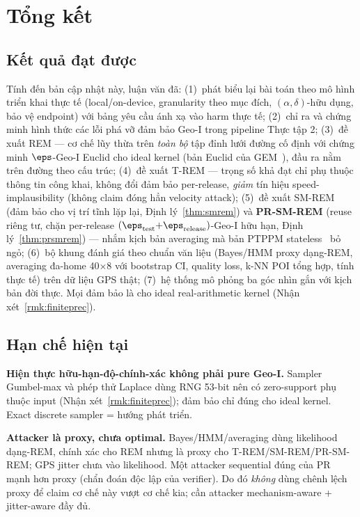 \chapter{Tổng kết}
\label{ch:tongket}

\section{Kết quả đạt được}

Tính đến bản cập nhật này, luận văn đã: (1)~phát biểu lại bài toán theo mô hình
triển khai thực tế (local/on-device, granularity theo mục đích, $(\alpha,\delta)$-hữu
dụng, bảo vệ endpoint) với bảng yêu cầu ánh xạ vào harm thực tế; (2)~chỉ ra và
chứng minh hình thức các lỗi phá vỡ đảm bảo Geo-I trong pipeline Thực tập 2;
(3)~đề xuất REM --- cơ chế lũy thừa trên \emph{toàn bộ} tập đỉnh lưới đường cố
định với chứng minh $\eps$-Geo-I Euclid cho ideal kernel (bản Euclid của
GEM~\cite{takagi2019geo}), đầu ra nằm trên đường theo cấu trúc; (4)~đề xuất T-REM
--- trọng số khả đạt chỉ phụ thuộc thông tin công khai, không đổi đảm bảo
per-release, \emph{giảm} tín hiệu speed-implausibility (không claim đóng hẳn
velocity attack); (5)~đề xuất SM-REM (đảm bảo cho vị trí tĩnh lặp lại,
Định lý~\ref{thm:smrem}) và \textbf{PR-SM-REM} (reuse riêng tư, chặn per-release
$(\eps_{\text{test}}{+}\eps_{\text{release}})$-Geo-I hữu hạn,
Định lý~\ref{thm:prsmrem}) --- nhắm kịch bản averaging mà bản PTPPM
stateless~\cite{min2025road} bỏ ngỏ; (6)~bộ khung đánh giá theo chuẩn văn liệu
(Bayes/HMM proxy dạng-REM, averaging đa-home 40$\times$8 với bootstrap CI,
quality loss, k-NN POI tổng hợp, tính thực tế) trên dữ liệu GPS thật; (7)~hệ
thống mô phỏng ba góc nhìn gắn với kịch bản đời thực. Mọi đảm bảo là cho ideal
real-arithmetic kernel (Nhận xét~\ref{rmk:finiteprec}).

\section{Hạn chế hiện tại}

\textbf{Hiện thực hữu-hạn-độ-chính-xác không phải pure Geo-I.} Sampler Gumbel-max
và phép thử Laplace dùng RNG 53-bit nên có zero-support phụ thuộc input
(Nhận xét~\ref{rmk:finiteprec}); đảm bảo chỉ đúng cho ideal kernel. Exact discrete
sampler = hướng phát triển.

\textbf{Attacker là proxy, chưa optimal.} Bayes/HMM/averaging dùng likelihood
dạng-REM, chính xác cho REM nhưng là proxy cho T-REM/SM-REM/PR-SM-REM; GPS jitter
chưa vào likelihood. Một attacker sequential đúng của PR mạnh hơn proxy (chẩn đoán
độc lập của verifier). Do đó \emph{không} dùng chênh lệch proxy để claim cơ chế
này vượt cơ chế kia; cần attacker mechanism-aware + jitter-aware đầy đủ.


